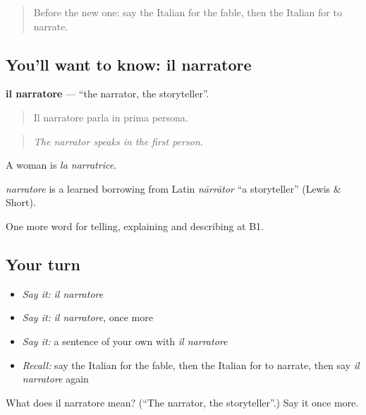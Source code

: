 \label{lesson:IT-C323-narratore}



\begin{quote}
Before the new one: say the Italian for the fable, then the Italian for to narrate.
\end{quote}

\subsection*{You'll want to know: il narratore}
\textbf{il narratore} — \textquotedblleft{}the narrator, the storyteller\textquotedblright{}.

\begin{quote}
Il narratore parla in prima persona.
\end{quote}

\begin{quote}
\emph{The narrator speaks in the first person.}
\end{quote}

A woman is \emph{la narratrice}.

\begin{cousinweb}
\emph{narratore} is a learned borrowing from Latin \emph{nārrātor} \textquotedblleft{}a storyteller\textquotedblright{} (Lewis \& Short).
\end{cousinweb}

\begin{grammarlens}[title={What you've built}]
One more word for telling, explaining and describing at B1.
\end{grammarlens}

\subsection*{Your turn}
\begin{itemize}
\raggedright
  \item \emph{Say it:} \emph{il narratore}
  \item \emph{Say it:} \emph{il narratore}, once more
  \item \emph{Say it:} a sentence of your own with \emph{il narratore}
  \item \emph{Recall:} say the Italian for the fable, then the Italian for to narrate, then say \emph{il narratore} again
\end{itemize}

\begin{tcolorbox}[breakable,colback=teal!4,colframe=teal!35!black,title={Before you move on}]
What does il narratore mean? (\textquotedblleft{}The narrator, the storyteller\textquotedblright{}.) Say it once more.
\end{tcolorbox}

